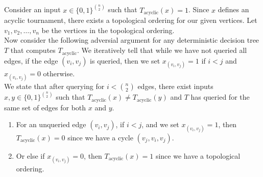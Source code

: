 \documentclass{article}
\begin{document}
\subsection{} \vspace*{-8mm}

Consider an input $x \in {\{0, 1\}}^{n \choose 2}$ such that $T_\text{acyclic}(x) = 1$. Since $x$ defines an acyclic tournament, there exists a topological ordering for our given vertices. Let $v_1, v_2, \dots, v_n$ be the vertices in the topological ordering. \\

\noindent
Now consider the following adversial argument for any deterministic decision tree $T$ that computes $T_\text{acyclic}$. We iteratively tell that while we have not queried all edges, if the edge $(v_i, v_j)$ is queried, then we set $x_{(v_i, v_j)} = 1$ if $i < j$ and $x_{(v_i, v_j)} = 0$ otherwise. \\

\noindent
We state that after querying for $ i < {n \choose 2} $ edges, there exist inputs $x, y \in {\{0, 1\}}^{n \choose 2}$ such that $T_\text{acyclic}(x) \neq T_\text{acyclic}(y)$ and $T$ has queried for the same set of edges for both $x$ and $y$. \\
\begin{enumerate}
	\item For an unqueried edge $(v_i, v_j)$, if $i < j$, and we set $x_{(v_i, v_j)} = 1$, then $T_\text{acyclic}(x) = 0$ since we have a cycle $(v_j, v_i, v_j)$.
	\item Or else if $x_{(v_i, v_j)} = 0$, then $T_\text{acyclic}(x) = 1$ since we have a topological ordering.
\end{enumerate}
\end{document}
